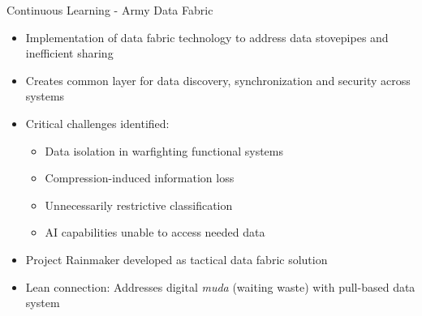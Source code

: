 \documentclass[aspectratio=169,11pt,xcolor={dvipsnames},hyperref={pdftex,pdfpagemode=UseNone,hidelinks,pdfdisplaydoctitle=true},usepdftitle=false]{beamer}
\begin{document}
  \begin{frame}{Continuous Learning - Army Data Fabric \cite{Patel2021}}
    \begin{itemize}
      \item Implementation of data fabric technology to address data stovepipes and inefficient sharing
      \item Creates common layer for data discovery, synchronization and security across systems
      \item Critical challenges identified:
        \begin{itemize}
          \item Data isolation in warfighting functional systems
          \item Compression-induced information loss
          \item Unnecessarily restrictive classification
          \item AI capabilities unable to access needed data
        \end{itemize}
      \item Project Rainmaker developed as tactical data fabric solution
      \item Lean connection: Addresses digital \textit{muda} (waiting waste) with pull-based data system
    \end{itemize}
  \end{frame}
\end{document}
